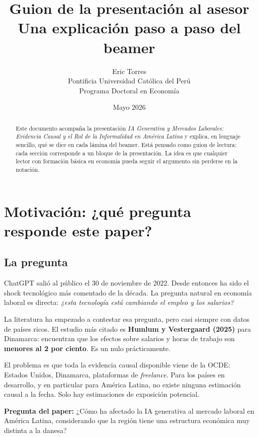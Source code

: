 \documentclass[12pt]{article}
\title{Guion de la presentación al asesor\\
\large Una explicación paso a paso del beamer}
\author{Eric Torres \\ \small Pontificia Universidad Católica del Perú \\ \small Programa Doctoral en Economía}
\date{Mayo 2026}
\begin{document}
\maketitle

\begin{abstract}
\noindent Este documento acompaña la presentación \emph{IA Generativa y Mercados Laborales: Evidencia Causal y el Rol de la Informalidad en América Latina} y explica, en lenguaje sencillo, qué se dice en cada lámina del beamer. Está pensado como guion de lectura: cada sección corresponde a un bloque de la presentación. La idea es que cualquier lector con formación básica en economía pueda seguir el argumento sin perderse en la notación.
\end{abstract}

\tableofcontents

\section{Motivación: ¿qué pregunta responde este paper?}

\subsection{La pregunta}

ChatGPT salió al público el 30 de noviembre de 2022. Desde entonces ha sido el shock tecnológico más comentado de la década. La pregunta natural en economía laboral es directa: \emph{¿esta tecnología está cambiando el empleo y los salarios?}

La literatura ha empezado a contestar esa pregunta, pero casi siempre con datos de países ricos. El estudio más citado es \textbf{Humlum y Vestergaard (2025)} para Dinamarca: encuentran que los efectos sobre salarios y horas de trabajo son \textbf{menores al 2 por ciento}. Es un nulo prácticamente.

El problema es que toda la evidencia causal disponible viene de la OCDE: Estados Unidos, Dinamarca, plataformas de \emph{freelance}. Para los países en desarrollo, y en particular para América Latina, no existe ninguna estimación causal a la fecha. Solo hay estimaciones de exposición potencial.

\begin{ideaclave}
\textbf{Pregunta del paper:} ¿Cómo ha afectado la IA generativa al mercado laboral en América Latina, considerando que la región tiene una estructura económica muy distinta a la danesa?
\end{ideaclave}
\end{document}
